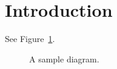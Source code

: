 \documentclass{article}
\begin{document}
\section{Introduction}\label{sec:intro}
See Figure~\ref{fig:myfig}.
\begin{figure}[htbp]
  \label{fig:myfig}
  \caption{A sample diagram.}
\end{figure}
\end{document}
